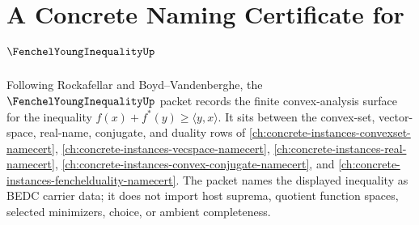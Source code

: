 \chapter{A Concrete Naming Certificate for $\FenchelYoungInequalityUp$}
\label{ch:concrete-instances-fenchel-young-inequality-namecert}

Following Rockafellar and Boyd--Vandenberghe, the $\FenchelYoungInequalityUp$ packet records the finite convex-analysis surface for the inequality $f(x)+f^\ast(y)\geq \langle y,x\rangle$. It sits between the convex-set, vector-space, real-name, conjugate, and duality rows of \autoref{ch:concrete-instances-convexset-namecert}, \autoref{ch:concrete-instances-vecspace-namecert}, \autoref{ch:concrete-instances-real-namecert}, \autoref{ch:concrete-instances-convex-conjugate-namecert}, and \autoref{ch:concrete-instances-fenchelduality-namecert}. The packet names the displayed inequality as BEDC carrier data; it does not import host suprema, quotient function spaces, selected minimizers, choice, or ambient completeness.

